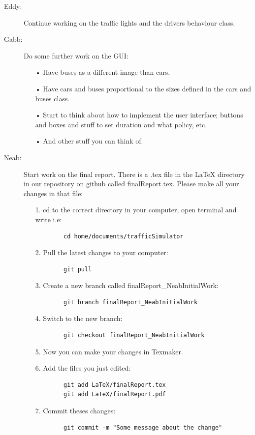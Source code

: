 \documentclass[11pt]{article}
\begin{document}
\begin{itemize}
\begin{description}
	\item[Eddy: ]Continue working on the traffic lights and the drivers behaviour class.
	\item[Gabb: ]Do some further work on the GUI:
	\begin{itemize}
		\item[•] Have buses as a different image than cars.
		\item[•] Have cars and buses proportional to the sizes defined in the cars and buses class. 
		\item[•] Start to think about how to implement the user interface; buttons and boxes and stuff to set duration and what policy, etc.
		\item[•] And other stuff you can think of.
	\end{itemize}
	\item[Neab: ] Start work on the final report. There is a .tex file in the LaTeX directory in our repository on github called finalReport.tex. Please make all your changes in that file:
	\begin{itemize}
		\item[1.] cd to the correct directory in your computer, open terminal and write i.e: 
		\begin{verbatim}
		cd home/documents/trafficSimulator
		\end{verbatim}
		\item[2.] Pull the latest changes to your computer:
		\begin{verbatim}
		git pull
		\end{verbatim}
		\item[3.] Create a new branch called finalReport\_NeabInitialWork: 
		\begin{verbatim}
		git branch finalReport_NeabInitialWork
		\end{verbatim}
		\item[4.] Switch to the new branch:
		\begin{verbatim}
		git checkout finalReport_NeabInitialWork
		\end{verbatim}
		\item[5.] Now you can make your changes in Texmaker.
		\item[6.] Add the files you just edited:
		\begin{verbatim}
		git add LaTeX/finalReport.tex
		git add LaTeX/finalReport.pdf
		\end{verbatim}
		\item[7.] Commit theses changes:
		\begin{verbatim}
		git commit -m "Some message about the change"

\end{verbatim}
\end{itemize}
\end{description}
\end{itemize}
\end{document}

